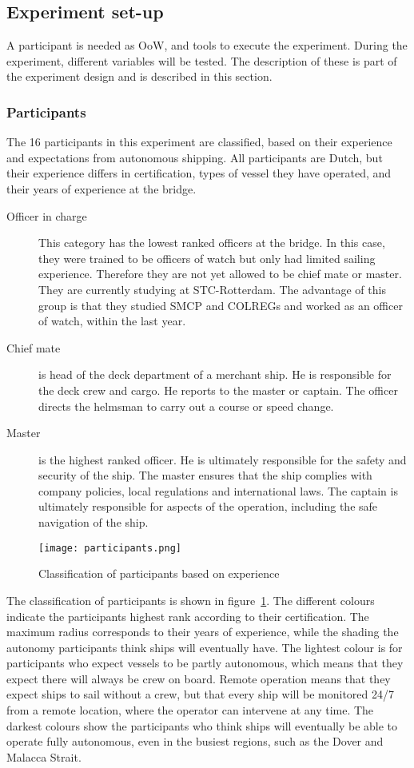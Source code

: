 \subsection{Experiment set-up}
A participant is needed as \acf{OoW}, and tools to execute the experiment. During the experiment, different variables will be tested. The description of these is part of the experiment design and is described in this section.

\subsubsection{Participants}
The 16 participants in this experiment are classified, based on their experience and expectations from autonomous shipping. All participants are Dutch, but their experience differs in certification, types of vessel they have operated, and their years of experience at the bridge.
\begin{description}
	\item[Officer in charge] This category has the lowest ranked officers at the bridge. In this case, they were trained to be officers of watch but only had limited sailing experience. Therefore they are not yet allowed to be chief mate or master. They are currently studying at STC-Rotterdam. The advantage of this group is that they studied SMCP and COLREGs and worked as an officer of watch, within the last year.
	\item[Chief mate] is head of the deck department of a merchant ship. He is responsible for the deck crew and cargo. He reports to the master or captain. The officer directs the helmsman to carry out a course or speed change.
	\item[Master] is the highest ranked officer. He is ultimately responsible for the safety and security of the ship. The master ensures that the ship complies with company policies, local regulations and international laws. The captain is ultimately responsible for aspects of the operation, including the safe navigation of the ship.
\end{description}

\begin{figure}[h]
	\centering
	\texttt{[image: participants.png]}
	\caption{Classification of participants based on experience}
	\label{fig:participants}
\end{figure}

The classification of participants is shown in figure~\ref{fig:participants}. The different colours indicate the participants highest rank according to their certification. The maximum radius corresponds to their years of experience, while the shading the autonomy participants think ships will eventually have. 
The lightest colour is for participants who expect vessels to be partly autonomous, which means that they expect there will always be crew on board. Remote operation means that they expect ships to sail without a crew, but that every ship will be monitored 24/7 from a remote location, where the operator can intervene at any time. The darkest colours show the participants who think ships will eventually be able to operate fully autonomous, even in the busiest regions, such as the Dover and Malacca Strait.

